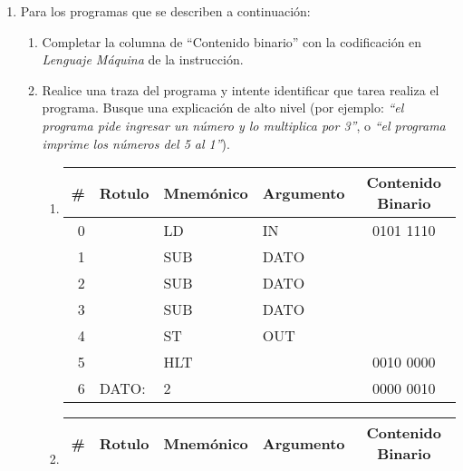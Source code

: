 \documentclass[12pt]{article}
\begin{document}
\begin{enumerate}

    \item Para los programas que se describen a continuación:

        \begin{enumerate}

            \item Completar la columna de ``Contenido binario'' con la
                codificación en \emph{Lenguaje Máquina} de la instrucción.

            \item Realice una traza del programa y intente identificar que
                tarea realiza el programa. Busque una explicación de alto
                nivel (por ejemplo: \emph{``el programa pide ingresar un número y lo
                multiplica por 3''}, o \emph{``el programa imprime los números del 5
                al 1''}).

            \begin{enumerate}
            \itemsep2em \parskip0pt 

                \item \begin{tabular}{r||l|l|l||c}

                    \textbf{\#} & \textbf{Rotulo} & \textbf{Mnemónico} &
                    \textbf{Argumento} & \textbf{Contenido Binario}\\
                    \hline
                    \hline

                    0 & & LD & IN & 0101 1110\\ \hline
                    1 & & SUB & DATO & \\ \hline
                    2 & & SUB & DATO & \\ \hline
                    3 & & SUB & DATO & \\ \hline
                    4 & & ST & OUT & \\ \hline
                    5 & & HLT & & 0010 0000\\ \hline
                    6 & DATO: & 2 & & 0000 0010\\

                \end{tabular}

                \item \begin{tabular}{r||l|l|l||c}

                    \textbf{\#} & \textbf{Rotulo} & \textbf{Mnemónico} &
                    \textbf{Argumento} & \textbf{Contenido Binario}\\
                    \hline
                    \hline


\end{tabular}
\end{enumerate}
\end{enumerate}
\end{enumerate}
\end{document}
